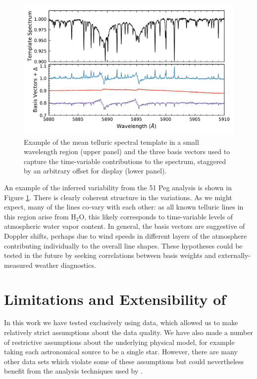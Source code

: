 \documentclass[modern]{aastex62}
\begin{document}
\begin{figure}
\centering
\includegraphics[width=5in]{telluric_basis2}
\caption{Example of the mean telluric spectral template in a small wavelength region (upper panel) and the three basis vectors used to capture the time-variable contributions to the spectrum, staggered by an arbitrary offset for display (lower panel).}
\label{fig:telluric_basis}
\end{figure}

An example of the inferred variability from the 51 Peg analysis is shown in Figure \ref{fig:telluric_basis}.
There is clearly coherent structure in the variations.
As we might expect, many of the lines co-vary with each other: as all known telluric lines in this region arise from H$_2$O, this likely corresponds to time-variable levels of atmospheric water vapor content.
In general, the basis vectors are suggestive of Doppler shifts, perhaps due to wind speeds in different layers of the atmosphere contributing individually to the overall line shapes.
These hypotheses could be tested in the future by seeking correlations between basis weights and externally-measured weather diagnostics.


\section{Limitations and Extensibility of \wobble}
\label{s:future}

In this work we have tested \wobble exclusively using \HARPS data, which allowed us to make relatively strict assumptions about the data quality.
We have also made a number of restrictive assumptions about the underlying physical model, for example taking each astronomical source to be a single star.
However, there are many other \EPRV data sets which violate some of these assumptions but could nevertheless benefit from the analysis techniques used by \wobble.
\end{document}
